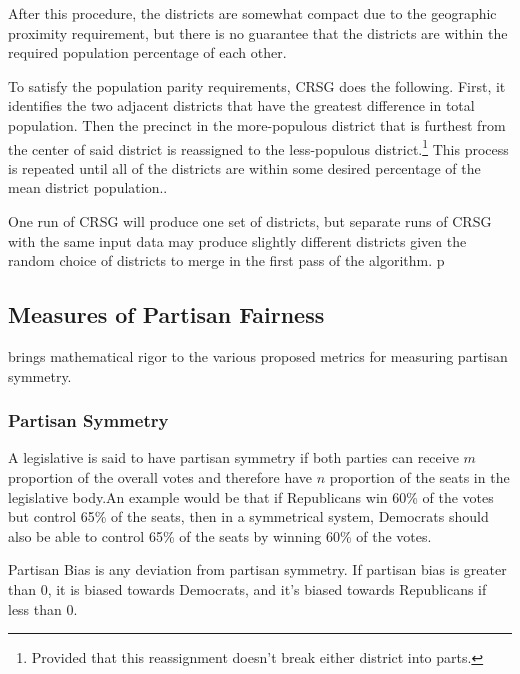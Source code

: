 After this procedure, the districts are somewhat compact due to the geographic proximity requirement, but there is no guarantee that the districts are within the required population percentage of each other. 

To satisfy the population parity requirements, CRSG does the following. First, it identifies the two adjacent districts that have the greatest difference in total population. Then the precinct in the more-populous district that is furthest from the center of said district is reassigned to the less-populous district.\footnote{Provided that this reassignment doesn't break either district into parts.} This process is repeated until all of the districts are within some desired percentage of the mean district population.\textcite[249-50]{chen2013}.

One run of CRSG will produce one set of districts, but separate runs of CRSG with the same input data may produce slightly different districts given the random choice of districts to merge in the first pass of the algorithm. 
p
\subsection{Measures of Partisan Fairness}

\textcite{katz2020} brings mathematical rigor to the various proposed metrics for measuring partisan symmetry. 

\subsubsection{Partisan Symmetry}

A legislative is said to have partisan symmetry if both parties can receive $m$ proportion of the overall votes and therefore have $n$ proportion of the seats in the legislative body.An example would be that if Republicans win 60\% of the votes but control 65\% of the seats, then in a symmetrical system, Democrats should also be able to control 65\% of the seats by winning 60\% of the votes. \textcite{katz2020}

Partisan Bias is any deviation from partisan symmetry. If partisan bias is greater than 0, it is biased towards Democrats, and it's biased towards Republicans if less than 0. \parencite{katz2020}

